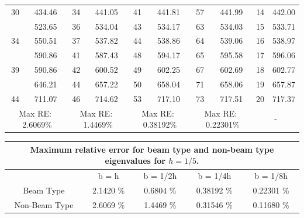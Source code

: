 \documentclass[8pt]{beamer}
\begin{document}
\begin{frame}
\begin{table}[htbp]
{{\begin{tabular}{|cc|cc|cc|cc||cc|}
                        {30} & 434.46 & {34} & 441.05 & {41} & 441.81 & {57} & 441.99 & 14    & 442.00 \\
                        \rowcolor{lightgray}{31} & 523.65 & {36} & 534.04 & {43} & 534.17 & {63} & 534.03 & 15    & 533.71 \\
                        {34} & 550.51 & {37} & 537.82 & {44} & 538.86 & {64} & 539.06 & 16    & 538.97 \\
                        \rowcolor{lightgray}{37} & 590.86 & {41} & 587.43 & {48} & 594.17 & {65} & 595.58 & 17    & 596.06 \\
                        {39} & 590.86 & {42} & 600.52 & {49} & 602.25 & {67} & 602.69 & 18    & 602.77 \\
                        \rowcolor{lightgray}{42} & 646.21 & {44} & 657.22 & {50} & 658.04 & {71} & 658.06 & 19    & 657.87 \\
                        {44} & 711.07 & {46} & 714.62 & {53} & 717.10 & {73} & 717.51 & 20    & 717.37 \\
                        \hline
                        \hline
                        \multicolumn{2}{|c|}{Max RE: \  2.6069\%} &\multicolumn{2}{c|}{Max RE: \ 1.4469\%}  & \multicolumn{2}{c|}{Max RE: \  0.38192\%}  & \multicolumn{2}{c||}{Max RE: \ 0.22301\%}& \multicolumn{2}{c|}{-} \\
                        \hline
                    \end{tabular}%
                    \label{tab:2v3_1}%
                }}
            \end{table}%
        \end{frame}

        \begin{frame}
            \begin{table}[htbp]
                \centering
                \begin{tabular}{|c|cccc|}
                    \hline
                    \multicolumn{5}{|c|}{Maximum relative error for beam type and non-beam type eigenvalues for $h = 1/5$.} \\
                    \hline
                    \hline
                    & {b = h} & {b = 1/2h} & {b = 1/4h} & {b = 1/8h} \\
                    \hline
                    Beam Type & 2.1420 \% & 0.6804 \% & 0.38192 \% & 0.22301 \% \\
                    Non-Beam Type & 2.6069 \% & 1.4469 \% & 0.31546 \% & 0.11680 \% \\
                    \hline
                \end{tabular}%
                \label{tab:2Dv3D_1_breakup}%
            \end{table}%
        \end{frame}
\end{document}
